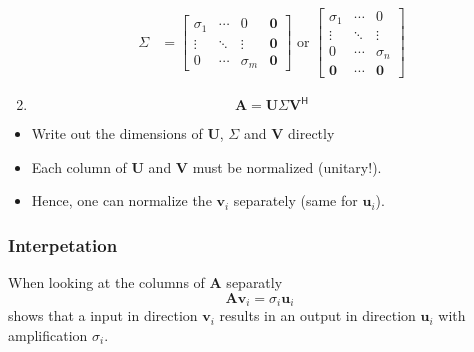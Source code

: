 \begin{enumerate}
\begin{align*}
              \Sigma   & = \begin{bmatrix}
                               \sigma_1 & \cdots & 0          & \mathbf{0} \\
                               \vdots   & \ddots & \vdots     & \mathbf{0} \\
                               0        & \cdots & \sigma_{m} & \mathbf{0}
                           \end{bmatrix}\text{ or }
              \begin{bmatrix}
                  \sigma_1   & \cdots & 0          \\
                  \vdots     & \ddots & \vdots     \\
                  0          & \cdots & \sigma_{n} \\
                  \mathbf{0} & \cdots & \mathbf{0}
              \end{bmatrix}
          \end{align*}
    \item \noindent\begin{equation*}
              \mathbf{A}=\mathbf{U}\Sigma \mathbf{V}^{\mathsf{H}}
          \end{equation*}
\end{enumerate}


\begin{itemize}
    \item Write out the dimensions of $\mathbf{U}$, $\Sigma$ and $\mathbf{V}$ directly
    \item Each column of $\mathbf{U}$ and $\mathbf{V}$ must be normalized (unitary!).
    \item Hence, one can normalize the $\mathbf{v}_i$ separately (same for $\mathbf{u}_i$).
\end{itemize}

\subsubsection{Interpetation}
When looking at the columns of $\mathbf{A}$ separatly
\noindent\begin{equation*}
    \mathbf{Av}_i=\sigma_i \mathbf{u}_i
\end{equation*}
shows that a input in direction $\mathbf{v}_i$ results in an output in direction $\mathbf{u}_i$ with amplification $\sigma_i$.

\newpar{}

